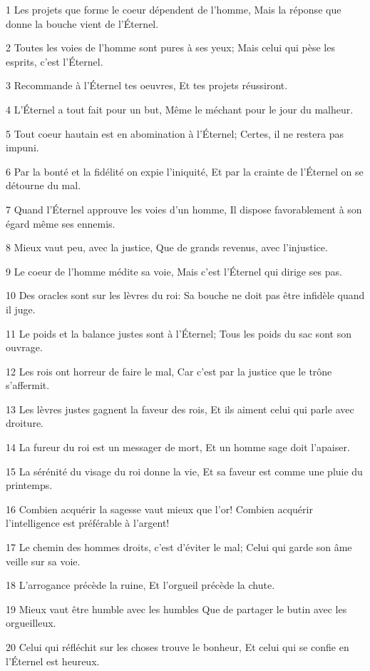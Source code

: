 \par 1 Les projets que forme le coeur dépendent de l'homme, Mais la réponse que donne la bouche vient de l'Éternel.
\par 2 Toutes les voies de l'homme sont pures à ses yeux; Mais celui qui pèse les esprits, c'est l'Éternel.
\par 3 Recommande à l'Éternel tes oeuvres, Et tes projets réussiront.
\par 4 L'Éternel a tout fait pour un but, Même le méchant pour le jour du malheur.
\par 5 Tout coeur hautain est en abomination à l'Éternel; Certes, il ne restera pas impuni.
\par 6 Par la bonté et la fidélité on expie l'iniquité, Et par la crainte de l'Éternel on se détourne du mal.
\par 7 Quand l'Éternel approuve les voies d'un homme, Il dispose favorablement à son égard même ses ennemis.
\par 8 Mieux vaut peu, avec la justice, Que de grands revenus, avec l'injustice.
\par 9 Le coeur de l'homme médite sa voie, Mais c'est l'Éternel qui dirige ses pas.
\par 10 Des oracles sont sur les lèvres du roi: Sa bouche ne doit pas être infidèle quand il juge.
\par 11 Le poids et la balance justes sont à l'Éternel; Tous les poids du sac sont son ouvrage.
\par 12 Les rois ont horreur de faire le mal, Car c'est par la justice que le trône s'affermit.
\par 13 Les lèvres justes gagnent la faveur des rois, Et ils aiment celui qui parle avec droiture.
\par 14 La fureur du roi est un messager de mort, Et un homme sage doit l'apaiser.
\par 15 La sérénité du visage du roi donne la vie, Et sa faveur est comme une pluie du printemps.
\par 16 Combien acquérir la sagesse vaut mieux que l'or! Combien acquérir l'intelligence est préférable à l'argent!
\par 17 Le chemin des hommes droits, c'est d'éviter le mal; Celui qui garde son âme veille sur sa voie.
\par 18 L'arrogance précède la ruine, Et l'orgueil précède la chute.
\par 19 Mieux vaut être humble avec les humbles Que de partager le butin avec les orgueilleux.
\par 20 Celui qui réfléchit sur les choses trouve le bonheur, Et celui qui se confie en l'Éternel est heureux.
